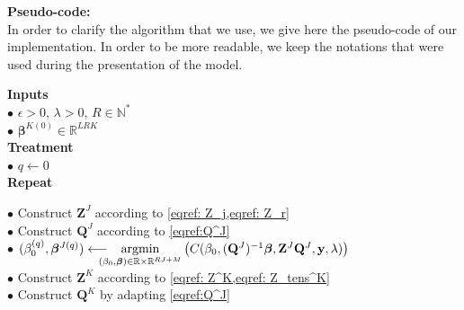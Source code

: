 \documentclass[10pt]{article}
\begin{document}
{\fontsize{12}{8}\selectfont \noindent \textbf{Pseudo-code:}}\\[1 pt]
In order to clarify the algorithm that we use, we give here the pseudo-code of our implementation. In order to be more readable, we keep the notations that were used during the presentation of the model.\\[5 pt]
\newpage
\begin{mdframed}[leftmargin=0cm, rightmargin=4cm]
    \noindent \textbf{Inputs}\\
    \phantom{a}\hspace{5 pt} $\bullet$ $\epsilon >0$, $\lambda >0$, $R \in \mathbb{N}^{*}$\\[2 pt]
    \phantom{a}\hspace{5 pt} $\bullet$ $\bm{\beta}^{K(0)} \in \mathbb{R}^{LRK}$\\[4 pt]
    \textbf{Treatment}\\
    \phantom{a}\hspace{5 pt} $\bullet$ $q \leftarrow 0$\\[2 pt]
    \phantom{a}\hspace{5 pt}  \textbf{Repeat}\\[2 pt]
    \phantom{a}\hspace{22 pt} $\bullet$ Construct $\mathbf{Z}^J$ according to \cref{eqref: Z_j,eqref: Z_r}\\[2 pt]
    \phantom{a}\hspace{25 pt} $\bullet$ Construct $\mathbf{Q}^J$ according to \cref{eqref:Q^J}\\[2 pt]
    \phantom{a}\hspace{25 pt}  $\bullet$ $(\beta_0^{(q)}, \bm{\beta}^{J {(q)}}) \longleftarrow \hspace{-10 pt} \underset{(\beta_0, \bm{\beta}) \in \mathbb{R} \times \mathbb{R}^{RJ + M}}{\text{argmin}} \left( C(\beta_0, (\mathbf{Q}^J)^{-1}\bm{\beta},\mathbf{Z}^J \mathbf{Q}^J, \mathbf{y}, \lambda) \right)$\\[2 pt]
    \phantom{a}\hspace{25 pt} $\bullet$ Construct $\mathbf{Z}^K$ according to \cref{eqref: Z^K,eqref: Z_tens^K}\\[3 pt]
    \phantom{a}\hspace{25 pt} $\bullet$ Construct $\mathbf{Q}^K$ by adapting \cref{eqref:Q^J}\\[2 pt]

\end{mdframed}
\end{document}
